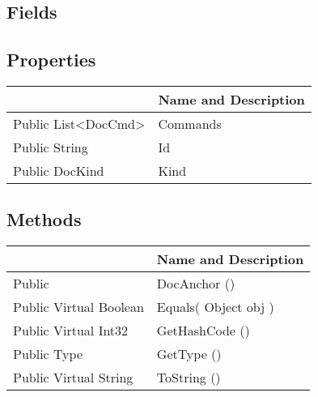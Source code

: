 \documentclass[11pt, oneside, a4paper]{book}
\begin{document}
\subsection{Fields}

\subsection{Properties}
\begin{center}
\begin{tabular}{| p{3cm} | p{12cm} | }
\hline
\textbf{ } & \textbf{ Name and Description}\\
\hline
 Public  List<DocCmd> &  Commands\hypertarget{SoftwareEngineeringTools.{}Documentation.{}DocAnchor.{}Commands}{}\\
\hline
 Public  String &  Id\hypertarget{SoftwareEngineeringTools.{}Documentation.{}DocAnchor.{}Id}{}\\
\hline
 Public  DocKind &  Kind\hypertarget{SoftwareEngineeringTools.{}Documentation.{}DocAnchor.{}Kind}{}\\
\hline
\end{tabular}
\end{center}

\subsection{Methods}
\begin{center}
\begin{tabular}{| p{3cm} | p{12cm} | }
\hline
\textbf{ } & \textbf{ Name and Description}\\
\hline
 Public  &  DocAnchor ()\hypertarget{SoftwareEngineeringTools.{}Documentation.{}DocAnchor.{}DocAnchor}{}\\
\hline
 Public  Virtual  Boolean &  Equals(\hypertarget{SoftwareEngineeringTools.{}Documentation.{}DocAnchor.{}Equals\_Object}{} Object  obj  )\\
\hline
 Public  Virtual  Int32 &  GetHashCode ()\hypertarget{SoftwareEngineeringTools.{}Documentation.{}DocAnchor.{}GetHashCode}{}\\
\hline
 Public  Type &  GetType ()\hypertarget{SoftwareEngineeringTools.{}Documentation.{}DocAnchor.{}GetType}{}\\
\hline
 Public  Virtual  String &  ToString ()\hypertarget{SoftwareEngineeringTools.{}Documentation.{}DocAnchor.{}ToString}{}\\
\hline
\end{tabular}
\end{center}
 
\end{document}
